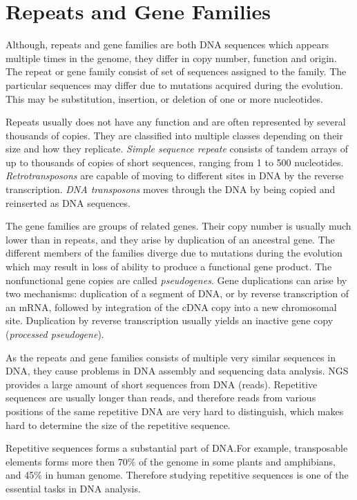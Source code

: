 \chapter{Repeats and Gene Families}\label{chap:repeatsfamilies}

Although, repeats and gene families are both DNA sequences which appears multiple times in the genome, they differ in copy number, function and origin.
The repeat or gene family consist of set of sequences assigned to the family. The particular sequences may differ due to mutations acquired during the evolution. This may be substitution, insertion, or deletion of one or more nucleotides.

Repeats usually does not have any function and are often represented by several thousands of copies\cite{cell}. They are classified into multiple classes depending on their size and how they replicate.
\emph{Simple sequence repeate} consists of tandem arrays of up to thousands of copies of short sequences, ranging from 1 to 500 nucleotides.
\emph{Retrotransposons} are capable of moving to different sites in DNA by the reverse transcription.
\emph{DNA transposons} moves through the DNA by being copied and reinserted as DNA sequences\cite{cell}.

The gene families are groups of related genes.
Their copy number is usually much lower than in repeats, and they arise by duplication of an ancestral gene. The different members of the families diverge due to mutations during the evolution which may result in loss of ability to produce a functional gene product. The nonfunctional gene copies are called \emph{pseudogenes}.
Gene duplications can arise by two mechanisms: duplication of a segment of DNA, or by reverse transcription of an mRNA, followed by integration of the cDNA copy into a new chromosomal site.
Duplication by reverse transcription usually yields an inactive gene copy (\emph{processed pseudogene}).

As the repeats and gene families consists of multiple very similar sequences in DNA, they cause problems in DNA assembly and sequencing data analysis. NGS provides a large amount of short sequences from DNA (reads). Repetitive sequences are usually longer than reads, and therefore reads from various positions of the same repetitive DNA are very hard to distinguish, which makes hard to determine the size of the repetitive sequence.

Repetitive sequences forms a substantial part of DNA.\@ For example,
transposable elements forms more then 70\% of the genome in some plants and amphibians, and 45\% in human genome\cite{biemont2006genetics}.
Therefore studying repetitive sequences is one of the essential tasks in DNA analysis.

